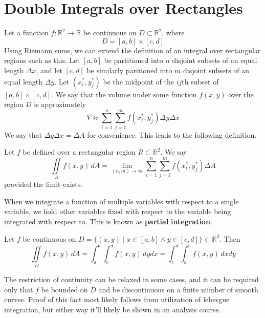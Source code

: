 \section{Double Integrals over Rectangles}
Let a function \(f:\mathbb{R}^2 \to \mathbb{R} \) be continuous on \(D \subset \mathbb{R}^2\), where 
\[
    D= [a,b]\times [c,d]
\]
Using Riemann sums, we can extend the definition of an integral over rectangular regions such as this. Let \([a,b]\) be partitioned into \(n\) disjoint subsets of an equal length \(\Delta x\), and let \([c,d]\) be similarly paritioned into \(m\) disjoint subsets of an equal length \(\Delta y\). Let \(\left( x_i^*,y_j^* \right) \) be the midpoint of the \(ij\)th subset of \([a,b]\times [c,d]\). We say that the volume under some function \(f(x,y)\) over the region \(D\) is approximately
\[
    V \approx \sum_{i=1}^n \sum_{j=1}^m f \left( x_i^*,y_j^* \right) \Delta y \Delta x
\]
We say that \(\Delta y \Delta x = \Delta A\) for convenience. This leads to the following definition.
\begin{definition}
    Let \(f\) be defined over a rectangular region \(R \subset \mathbb{R}^2\). We say
    \[
        \iint\limits_{R}f(x,y)\,dA = \lim_{(n,m) \to \infty}\sum_{i=1}^n \sum_{j=1}^m f \left( x_i^*,y_j^* \right)\Delta A
    \]
    provided the limit exists.
\end{definition}
\begin{remark}
    When we integrate a function of multiple variables with respect to a single variable, we hold other variables fixed with respect to the variable being integrated with respect to. This is known as \textbf{partial} \textbf{integration}.
\end{remark}
\begin{theorem}\label{Fubini}
    Let \(f\) be continuous on \(D=\{ (x,y)\mid x\in[a,b]\land y\in[c,d] \} \subset \mathbb{R}^2\). Then
    \[
        \iint\limits_{D}f(x,y)\,dA = \int_a^b \int_c^d f(x,y)\,dydx = \int_c^d \int_a^b f(x,y)\,dxdy
    \]
\end{theorem}
\begin{remark}
    The restriction of continuity can be relaxed in some cases, and it can be required only that \(f\) be bounded on \(D\) and be discontinuous on a finite number of smooth curves. Proof of this fact most likely follows from utilization of lebesgue integration, but either way it'll likely be shown in an analysis course.
\end{remark}
